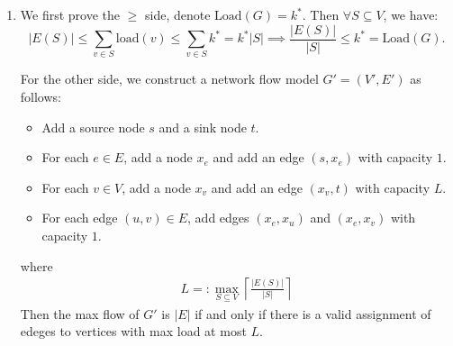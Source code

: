 \begin{answer}
    \begin{enumerate}[label=\alph*).]
        \item We first prove the $\geq$ side, denote $\text{Load}(G) = k^*$. Then $\forall S \subseteq V$, we have:
        \begin{equation}
            \label{eq:6.1.1}
            |E(S)| \le \sum_{v\in S} \text{load}(v) \le \sum_{v\in S} k^* = k^* |S| \implies \frac{|E(S)|}{|S|} \le k^* = \text{Load}(G).
        \end{equation}
        
        For the other side, we construct a network flow model $G' = (V', E')$ as follows:
        \begin{itemize}
            \item Add a source node $s$ and a sink node $t$.
            \item For each $e \in E$, add a node $x_e$ and add an edge $(s, x_e)$ with capacity $1$.
            \item For each $v \in V$, add a node $x_v$ and add an edge $(x_v, t)$ with capacity $L$.
            \item For each edge $(u, v) \in E$, add edges $(x_e, x_u)$ and $(x_e, x_v)$ with capacity $1$.
        \end{itemize}
        where 
        \begin{align*}
            L =: \max_{S\subseteq V}\left\lceil\frac{|E(S)|}{|S|}\right\rceil
        \end{align*}
        Then the max flow of $G'$ is $|E|$ if and only if there is a valid assignment of edeges to vertices with max load at most $L$.


\end{enumerate}
\end{answer}
